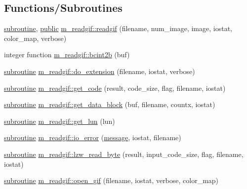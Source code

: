 \subsection*{Functions/\+Subroutines}
\begin{DoxyCompactItemize}
\item 
\hyperlink{M__stopwatch_83_8txt_acfbcff50169d691ff02d4a123ed70482}{subroutine}, \hyperlink{M__stopwatch_83_8txt_a2f74811300c361e53b430611a7d1769f}{public} \hyperlink{namespacem__readgif_a775e2da2a9f54ec308e87a339a393ed6}{m\+\_\+readgif\+::readgif} (filename, num\+\_\+image, image, iostat, color\+\_\+map, verbose)
\item 
integer function \hyperlink{namespacem__readgif_a38594ce718f97f844771250edcd5e496}{m\+\_\+readgif\+::bcint2b} (buf)
\item 
\hyperlink{M__stopwatch_83_8txt_acfbcff50169d691ff02d4a123ed70482}{subroutine} \hyperlink{namespacem__readgif_a93c5f69ee5054ba2c10ed17b8ab53f6b}{m\+\_\+readgif\+::do\+\_\+extension} (filename, iostat, verbose)
\item 
\hyperlink{M__stopwatch_83_8txt_acfbcff50169d691ff02d4a123ed70482}{subroutine} \hyperlink{namespacem__readgif_a027fedbf7ba68763483988c1aa6d2cea}{m\+\_\+readgif\+::get\+\_\+code} (result, code\+\_\+size, flag, filename, iostat)
\item 
\hyperlink{M__stopwatch_83_8txt_acfbcff50169d691ff02d4a123ed70482}{subroutine} \hyperlink{namespacem__readgif_ace6e51d0293107696bd1482348414a43}{m\+\_\+readgif\+::get\+\_\+data\+\_\+block} (buf, filename, countx, iostat)
\item 
\hyperlink{M__stopwatch_83_8txt_acfbcff50169d691ff02d4a123ed70482}{subroutine} \hyperlink{namespacem__readgif_a7109d632cddcb8d66729d25bbed5c33c}{m\+\_\+readgif\+::get\+\_\+lun} (lun)
\item 
\hyperlink{M__stopwatch_83_8txt_acfbcff50169d691ff02d4a123ed70482}{subroutine} \hyperlink{namespacem__readgif_ae01d3edbe9e15bf4dd33070581e26fee}{m\+\_\+readgif\+::io\+\_\+error} (\hyperlink{M__stopwatch_83_8txt_aa4313e9a55405841f95e6550cd87fc3b}{message}, iostat, filename)
\item 
\hyperlink{M__stopwatch_83_8txt_acfbcff50169d691ff02d4a123ed70482}{subroutine} \hyperlink{namespacem__readgif_a314e657d0662360266bac5702a657ef1}{m\+\_\+readgif\+::lzw\+\_\+read\+\_\+byte} (result, input\+\_\+code\+\_\+size, flag, filename, iostat)
\item 
\hyperlink{M__stopwatch_83_8txt_acfbcff50169d691ff02d4a123ed70482}{subroutine} \hyperlink{namespacem__readgif_ae008e851af60f4d8fdeeb4fd96b8580d}{m\+\_\+readgif\+::open\+\_\+gif} (filename, iostat, verbose, color\+\_\+map)

\end{DoxyCompactItemize}
